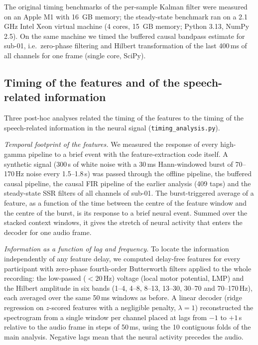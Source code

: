 \documentclass{iopjournal}
\begin{document}
The original timing benchmarks of the per-sample Kalman filter were measured on an Apple M1 with 16~GB memory; the steady-state benchmark ran on a 2.1\,GHz Intel Xeon virtual machine (4 cores, 15~GB memory; Python 3.13, NumPy 2.5). On the same machine we timed the buffered causal bandpass estimate for sub-01, i.e.\ zero-phase filtering and Hilbert transformation of the last 400\,ms of all channels for one frame (single core, SciPy).

\subsection{Timing of the features and of the speech-related information}
\label{sec:timing_methods}

Three post-hoc analyses related the timing of the features to the timing of the speech-related information in the neural signal (\texttt{timing\_analysis.py}).

\textit{Temporal footprint of the features.} We measured the response of every high-gamma pipeline to a brief event with the feature-extraction code itself. A synthetic signal (300\,s of white noise with a 30\,ms Hann-windowed burst of 70--170\,Hz noise every 1.5--1.8\,s) was passed through the offline pipeline, the buffered causal pipeline, the causal FIR pipeline of the earlier analysis (409 taps) and the steady-state SSR filters of all channels of sub-01. The burst-triggered average of a feature, as a function of the time between the centre of the feature window and the centre of the burst, is its response to a brief neural event. Summed over the stacked context windows, it gives the stretch of neural activity that enters the decoder for one audio frame.

\textit{Information as a function of lag and frequency.} To locate the information independently of any feature delay, we computed delay-free features for every participant with zero-phase fourth-order Butterworth filters applied to the whole recording: the low-passed ($<20$\,Hz) voltage (local motor potential, LMP) and the Hilbert amplitude in six bands (1--4, 4--8, 8--13, 13--30, 30--70 and 70--170\,Hz), each averaged over the same 50\,ms windows as before. A linear decoder (ridge regression on $z$-scored features with a negligible penalty, $\lambda=1$) reconstructed the spectrogram from a single window per channel placed at lags from $-1$ to $+1$\,s relative to the audio frame in steps of 50\,ms, using the 10 contiguous folds of the main analysis. Negative lags mean that the neural activity precedes the audio.
\end{document}
